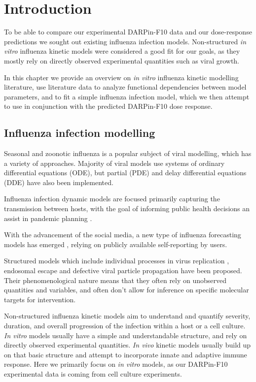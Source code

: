 \section{Introduction}

To be able to compare our experimental DARPin-F10 data and our dose-response predictions we sought out existing influenza infection models. Non-structured \textit{in vitro} influenza kinetic models were considered a good fit for our goals, as they mostly rely on directly observed experimental quantities such as viral growth.

In this chapter we provide an overview on \textit{in vitro} influenza kinetic modelling literature, use literature data \cite{rudiger2019multiscale, schulze2009infection} to analyze functional dependencies between model parameters, and to fit a simple influenza infection model, which we then attempt to use in conjunction with the predicted DARPin-F10 dose response.

\subsection{Influenza infection modelling}

Seasonal and zoonotic influenza is a popular subject of viral modelling, which has a variety of approaches. Majority of viral models use systems of ordinary differential equations (ODE), but partial (PDE) and delay differential equations (DDE) have also been implemented.

Influenza infection dynamic models are focused primarily capturing the transmission between hosts, with the goal of informing public health decisions an assist in pandemic planning \cite{ferguson2006strategies, mcvernon2007model}.

With the advancement of the social media, a new type of influenza forecasting models has emerged \cite{pawelek2014modeling, santillana2015combining}, relying on publicly available self-reporting by users.

Structured models which include individual processes in virus replication \cite{sidorenko2004structured}, endosomal escape \cite{lagache2012modeling} and defective viral particle propagation \cite{rudiger2019multiscale} have been proposed. Their phenomenological nature means that they often rely on unobserved quantities and variables, and often don't allow for inference on specific molecular targets for intervention.

Non-structured influenza kinetic models aim to understand and quantify severity, duration, and overall progression of the infection within a host or a cell culture. \textit{In vitro} models usually have a simple and understandable structure, and rely on directly observed experimental quantities. \textit{In vivo} kinetic models usually build up on that basic structure and attempt to incorporate innate \cite{beauchemin2008modeling} and adaptive \cite{belz2002compromised} immune response. Here we primarily focus on \textit{in vitro} models, as our DARPin-F10 experimental data is coming from cell culture experiments.

